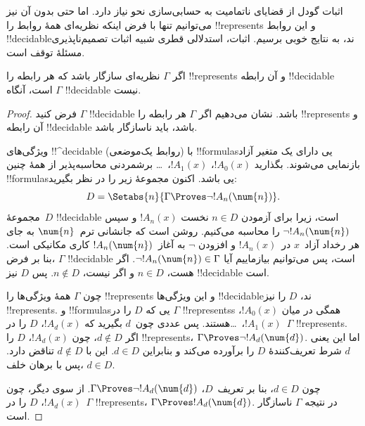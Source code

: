\documentclass[../../../include/open-logic-section]{subfiles}
\begin{document}


اثبات گودل از قضایای ناتمامیت به حسابی‌سازی نحو نیاز دارد. اما حتی
بدون آن نیز می‌توانیم تنها با فرض اینکه نظریه‌ای همهٔ روابط را
!!{represents} و این روابط !!{decidable}ند، به نتایج خوبی برسیم. اثبات،
استدلالی قطری شبیه اثبات تصمیم‌ناپذیری مسئلهٔ توقف است.

\begin{thm}
اگر $\Gamma$ نظریه‌ای سازگار باشد که هر رابطه را !!{represents}
و آن رابطه !!{decidable} است، آنگاه $\Gamma$ !!{decidable} نیست.
\end{thm}

\begin{proof}
فرض کنید $\Gamma$ !!{decidable} باشد. نشان می‌دهیم اگر $\Gamma$ هر
رابطه را !!{represents} و آن رابطه !!{decidable} باشد، باید ناسازگار باشد.

ویژگی‌های !!^{decidable} (روابط یک‌موضعی) با !!{formula}sیی دارای یک
متغیر آزاد بازنمایی می‌شوند. بگذارید $!A_0(x)$، $!A_1(x)$،~\dots
برشمردنی محاسبه‌پذیر از همهٔ چنین !!{formula}sیی باشد. اکنون مجموعهٔ
زیر را در نظر بگیرید:
\[
D = \Setabs{n}{\Gamma \Proves \lnot !A_n(\num{n})}.
\]
مجموعهٔ~$D$ !!{decidable} است، زیرا برای آزمودن $n\in D$ نخست
$!A_n(x)$ و سپس $\lnot !A_n(\num{n})$ را محاسبه می‌کنیم. روشن است که
جانشانی ترم~$\num{n}$ به جای هر رخداد آزاد~$x$ در~$!A_n(x)$ و افزودن
$\lnot$ به آغاز~$!A_n(\num{n})$ کاری مکانیکی است. بنا بر فرض،
$\Gamma$ !!{decidable} است، پس می‌توانیم بیازماییم آیا
$\lnot !A_n(\num{n})\in\Gamma$. اگر هست، $n\in D$ و اگر نیست،
$n\notin D$. پس $D$ نیز !!{decidable} است.

چون $\Gamma$ همهٔ ویژگی‌ها را !!{represents} و این ویژگی‌ها
!!{decidable}ند،
$D$ را نیز !!{represents}. و !!{formula}sیی که $D$ را در
$\Gamma$ !!{represents}s همگی در میان
$!A_0(x)$، $!A_1(x)$،~\dots هستند. پس عددی چون~$d$ بگیرید که
$!A_d(x)$، $D$ را در~$\Gamma$ !!{represents}. اگر $d\notin D$، چون
$!A_d(x)$، $D$ را !!{represents}،
$\Gamma\Proves\lnot !A_d(\num{d})$. اما این یعنی $d$ شرط تعریف‌کنندهٔ
$D$ را برآورده می‌کند و بنابراین $d\in D$. این با $d\notin D$ تناقض
دارد. پس با برهان خلف، $d\in D$.

چون $d\in D$، بنا بر تعریف~$D$،
$\Gamma\Proves\lnot !A_d(\num{d})$. از سوی دیگر، چون $!A_d(x)$، $D$
را در~$\Gamma$ !!{represents}،
$\Gamma\Proves !A_d(\num{d})$. در نتیجه $\Gamma$ ناسازگار است.
\end{proof}
\end{document}
